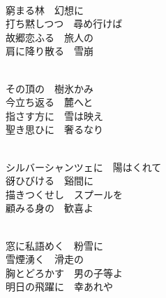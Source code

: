 \documentclass[10pt,b5j]{tarticle} %
\begin{document}
\begin{enumerate}
\begin{minipage}[c]{\blocksize}
    \end{minipage}
    \begin{minipage}[c]{\blocksize}
        
        \vspace{\linespace}
        \item~\\
        窮まる林　幻想に\\
        打ち黙しつつ　尋め行けば\\
        故郷恋ふる　旅人の\\
        肩に降り散る　雪崩
        
    \end{minipage}
    \begin{minipage}[c]{\blocksize}
        
        \vspace{\linespace}
        \item~\\
        その頂の　樹氷かみ\\
        今立ち返る　麓へと\\
        指さす方に　雪は映え\\
        聖き思ひに　奢るなり
        
    \end{minipage}
    \begin{minipage}[c]{\blocksize}
        
        \vspace{\linespace}
        \item~\\
        シルバーシャンツェに　陽はくれて\\
        谺ひびける　谿間に\\
        描きつくせし　スプールを\\
        顧みる身の　歓喜よ
        
    \end{minipage}
    \begin{minipage}[c]{\blocksize}
        
        \vspace{\linespace}
        \item~\\
        窓に私語めく　粉雪に\\
        雪煙湧く　滑走の\\
        胸とどろかす　男の子等よ\\
        明日の飛躍に　幸あれや
    
    \end{minipage}
\end{enumerate} %
\end{document}
